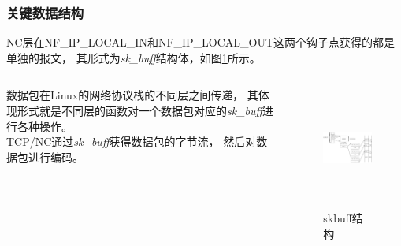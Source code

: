 \begin{frame}
	\frametitle{关键数据结构}
	NC层在NF\_IP\_LOCAL\_IN和NF\_IP\_LOCAL\_OUT这两个钩子点获得的都是单独的报文，
	其形式为\emph{sk\_buff}结构体，如图\ref{fig:skbuff}所示。
		\begin{columns}
		\begin{column}{0.5\textwidth}
			数据包在Linux的网络协议栈的不同层之间传递，
			其体现形式就是不同层的函数对一个数据包对应的\emph{sk\_buff}进行各种操作。
			\\
			TCP/NC通过\emph{sk\_buff}获得数据包的字节流，
			然后对数据包进行编码。
		\end{column}
		\begin{column}{0.4\textwidth}
			\vspace{-1.5em}
			\begin{figure}
				\includegraphics[height=4cm]{../figures/skbuff.eps}
				\caption{skbuff结构}
				\label{fig:skbuff}
			\end{figure}
		\end{column}
	\end{columns}
	
\end{frame}
